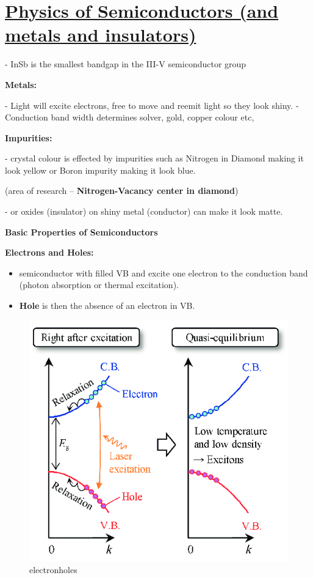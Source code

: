  \section[Physics of Semiconductors (and metals and insulators)]{\hyperlink{toc}{Physics of Semiconductors (and metals and insulators)}}


- InSb is the smallest bandgap in the III-V semiconductor group


\textbf{Metals:}

- Light will excite electrons, free to move and reemit light so they look shiny.
- Conduction band width determines solver, gold, copper colour etc,

\textbf{Impurities:}

- crystal colour is effected by impurities such as Nitrogen in Diamond making it look yellow or Boron impurity making it look blue.

(area of research -- \textbf{Nitrogen-Vacancy center in diamond})

- or oxides (insulator) on shiny metal (conductor) can make it look matte.

\textbf{Basic Properties of Semiconductors}


\textbf{Electrons and Holes:}
\begin{itemize}
    \item semiconductor with filled VB and excite one electron to the conduction band (photon absorption or thermal excitation).
    \item \textbf{Hole} is then the absence of an electron in VB.
\end{itemize}

 
 \begin{figure}
 \centering
  \includegraphics[width=0.75\linewidth]{Images/electron-holes.png}
  \caption{electronholes}
  \label{fig:electronholes}
\end{figure}

